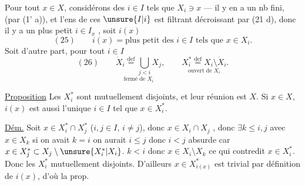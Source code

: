 Pour tout $x\in X$, considérons  des $i\in I$ tels
que $X_i\ni x$ --- il y en a un nb fini, 
(par (1' a)), et l'ens de ces $\unsure{I|i}$ est filtrant
décroissant par (21 d), donc il y a
un plus petit $i\in I_x$ , soit $i(x)$
\[
(25)\qquad i(x)=\text{plus petit des }i\in I\text{ tels que }x\in X_i.
\]
Soit d'autre part, pour tout $i\in I$
\[
(26)\qquad
\underset{\text{fermé de }X_i}{\dot X_i\overset{\mathrm{def}}=\bigcup_{j<i}X_j},
\qquad
\underset{\text{ouvert de }X_i}{X_i^*\overset{\mathrm{def}}=X_i\setminus\dot X_i}.
\]


\uline{Proposition} Les $X_i^*$ sont mutuellement disjoints, et leur réunion est $X$. Si $x\in X$, $i(x)$ est aussi l'unique $i\in I$ tel que $x\in X_i^*$.

\uline{Dém.} Soit $x\in X_i^*\cap X_j^*$ ($i,j\in I$, $i\ne j$), donc  $x\in X_i\cap X_j$ , donc $\exists k\leq i,j$ avec
$x\in X_k$ si on avait $k=i$ on aurait $i\leq j$ donc $i<j$ absurde car $x\in X_j^*\subset X_j\setminus\unsure{X_i^*|X_i}$.
 $k<i$ donc $x\in X_i\setminus X_k$ ce qui contredit $x\in X_i^*$. Donc les $X_i^*$ mutuellement disjoints. D'ailleurs $x\in X_{i(x)}^*$ est trivial par définition de $i(x)$, d'où la prop.

